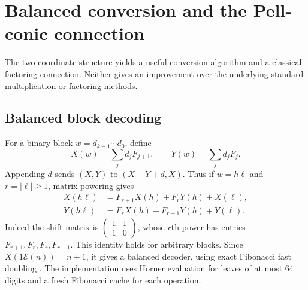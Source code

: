 \documentclass[11pt]{article}
\theoremstyle{definition}\newtheorem{definition}[theorem]{Definition}
\newcommand{\E}{\mathcal E}
\begin{document}
\section{Balanced conversion and the Pell-conic connection}
\label{sec:fast}
The two-coordinate structure yields a useful conversion algorithm and a
classical factoring connection. Neither gives an improvement over the
underlying standard multiplication or factoring methods.

\subsection{Balanced block decoding}
For a binary block $w=d_{k-1}\cdots d_0$, define
\[
 X(w)=\sum_jd_jF_{j+1},\qquad Y(w)=\sum_jd_jF_j.
\]
Appending $d$ sends $(X,Y)$ to $(X+Y+d,X)$. Thus if $w=h\ell$ and
$r=|\ell|\ge1$, matrix powering gives
\begin{align*}
 X(h\ell)&=F_{r+1}X(h)+F_rY(h)+X(\ell),\\
 Y(h\ell)&=F_rX(h)+F_{r-1}Y(h)+Y(\ell).
\end{align*}
Indeed the shift matrix is $\left(\begin{smallmatrix}1&1\\1&0\end{smallmatrix}\right)$,
whose $r$th power has entries $F_{r+1},F_r,F_r,F_{r-1}$.
This identity holds for arbitrary blocks. Since $X(1\E(n))=n+1$,
it gives a balanced decoder, using exact Fibonacci fast doubling
\cite{gmp}. The implementation uses Horner evaluation for leaves of at
most 64 digits and a fresh Fibonacci cache for each operation.
\end{document}
